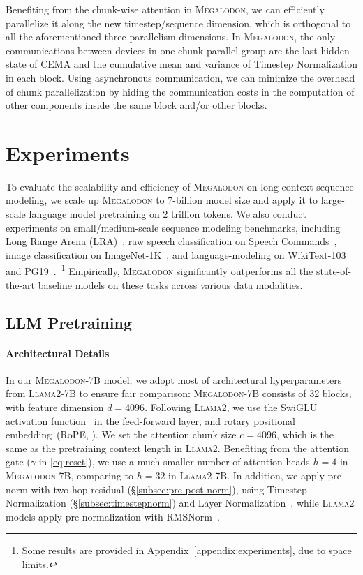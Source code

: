 Benefiting from the chunk-wise attention in \textsc{Megalodon}, we can efficiently parallelize it along the new timestep/sequence dimension, which is orthogonal to all the aforementioned three parallelism dimensions. In \textsc{Megalodon}, the only communications between devices in one chunk-parallel group are the last hidden state of CEMA and the cumulative mean and variance of Timestep Normalization in each block. Using asynchronous communication, we can minimize the overhead of chunk parallelization by hiding the communication costs in the computation of other components inside the same block and/or other blocks.

\section{Experiments}
\label{sec:exp}

To evaluate the scalability and efficiency of \textsc{Megalodon} on long-context sequence modeling, we scale up \textsc{Megalodon} to 7-billion model size and apply it to large-scale language model pretraining on 2 trillion tokens. We also conduct experiments on small/medium-scale sequence modeling benchmarks, including Long Range Arena (LRA)~\citep{tay2021long}, raw speech classification on Speech Commands~\citep{warden2018speech}, image classification on ImageNet-1K~\citep{deng2009imagenet}, and language-modeling on WikiText-103~\citep{merity2017pointer} and PG19~\citep{raecompressive2019}.~\footnote{Some results are provided in Appendix~\ref{appendix:experiments}, due to space limits.} Empirically, \textsc{Megalodon} significantly outperforms all the state-of-the-art baseline models on these tasks across various data modalities. 

\subsection{LLM Pretraining}
\paragraph{Architectural Details} In our \textsc{Megalodon}-7B model, we adopt most of architectural hyperparameters from \textsc{Llama}2-7B to ensure fair comparison: \textsc{Megalodon}-7B consists of 32 blocks, with feature dimension $d=4096$. Following \textsc{Llama}2, we use the SwiGLU activation function~\citep{shazeer2020glu} in the feed-forward layer, and rotary positional embedding~(RoPE, \citet{su2021roformer}).
We set the attention chunk size $c=4096$, which is the same as the pretraining context length in \textsc{Llama}2.
Benefiting from the attention gate ($\gamma$ in \eqref{eq:reset}), we use a much smaller number of attention heads $h=4$ in \textsc{Megalodon}-7B, comparing to $h=32$ in \textsc{Llama}2-7B. 
In addition, we apply pre-norm with two-hop residual (\S\ref{subsec:pre-post-norm}), using Timestep Normalization (\S\ref{subsec:timestepnorm}) and Layer Normalization~\citep{ba2016layer}, while \textsc{Llama}2 models apply pre-normalization with RMSNorm~\citep{zhang2019root}.

